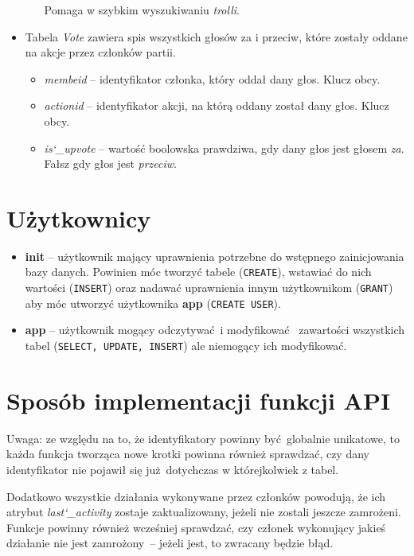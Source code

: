 \documentclass[12pt]{article}
\begin{document}
\begin{itemize}
\begin{itemize}
{              Pomaga w szybkim wyszukiwaniu \textit{trolli}.}
    \end{itemize}
    \item{Tabela \textit{Vote} zawiera spis wszystkich głosów za i przeciw, 
          które zostały oddane na akcje przez członków partii.}
    \begin{itemize}
        \item{\textit{membeid} -- identyfikator członka, który oddał dany głos.
              Klucz obcy.}
        \item{\textit{actionid} -- identyfikator akcji, na którą oddany został
              dany głos. Klucz obcy.}
        \item{\textit{is\char`_upvote} -- wartość boolowska prawdziwa, gdy dany
              głos jest głosem \textit{za}. Fałsz gdy głos jest \textit{przeciw}.}
    \end{itemize}
\end{itemize}

\section{Użytkownicy}

\begin{itemize}
    \item{\textbf{init}} -- użytkownik mający uprawnienia potrzebne do
          wstępnego zainicjowania bazy danych. Powinien móc tworzyć tabele
          (\texttt{CREATE}), wstawiać do nich wartości (\texttt{INSERT})
          oraz nadawać uprawnienia innym użytkownikom (\texttt{GRANT}) aby
          móc utworzyć użytkownika \textbf{app} (\texttt{CREATE USER}).
    \item{\textbf{app}} -- użytkownik mogący odczytywać i modyfikować 
          zawartości wszystkich tabel (\texttt{SELECT, UPDATE, INSERT}) ale niemogący 
          ich modyfikować.
\end{itemize}

\section{Sposób implementacji funkcji API}

Uwaga: ze względu na to, że identyfikatory powinny być globalnie unikatowe, to
każda funkcja tworząca nowe krotki powinna również sprawdzać, czy dany identyfikator
nie pojawił się już dotychczas w którejkolwiek z tabel.

Dodatkowo wszystkie działania wykonywane przez członków powodują, że ich atrybut
\textit{last\char`_activity} zostaje zaktualizowany, jeżeli nie zostali jeszcze
zamrożeni. Funkcje powinny również wcześniej sprawdzać, czy członek wykonujący 
jakieś działanie nie jest zamrożony -- jeżeli jest, to zwracany będzie błąd.
\end{document}
